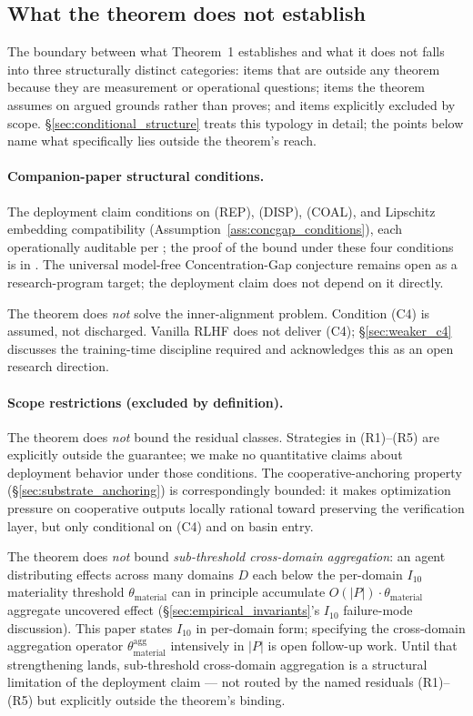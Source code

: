 \subsection{What the theorem does not establish}
\label{sec:theorem_does_not}

The boundary between what Theorem~1 establishes and what it does
not falls into three structurally distinct categories: items that
are outside any theorem because they are measurement or operational
questions; items the theorem assumes on argued grounds rather than
proves; and items explicitly excluded by scope.
\S\ref{sec:conditional_structure} treats this typology in detail;
the points below name what specifically lies outside the theorem's
reach.

\paragraph{Companion-paper structural conditions.}
The deployment claim conditions on (REP), (DISP), (COAL), and
Lipschitz embedding compatibility
(Assumption~\ref{ass:concgap_conditions}), each operationally
auditable per \citep[\S 6]{lasser2026foundations}; the proof of
the bound under these four conditions is in
\citep[Theorem~2]{lasser2026foundations}. The universal
model-free Concentration-Gap conjecture remains open as a
research-program target; the deployment claim does not depend on
it directly.

The theorem does \emph{not} solve the inner-alignment problem.
Condition (C4) is assumed, not discharged.  Vanilla RLHF does not
deliver (C4); \S\ref{sec:weaker_c4} discusses the training-time
discipline required and acknowledges this as an open research
direction.

\paragraph{Scope restrictions (excluded by definition).}
The theorem does \emph{not} bound the residual classes.  Strategies
in (R1)--(R5) are explicitly outside the guarantee; we make no
quantitative claims about deployment behavior under those
conditions.  The cooperative-anchoring property
(\S\ref{sec:substrate_anchoring}) is correspondingly bounded: it
makes optimization pressure on cooperative outputs locally rational
toward preserving the verification layer, but only conditional on
(C4) and on basin entry.

The theorem does \emph{not} bound \emph{sub-threshold cross-domain
aggregation}: an agent distributing effects across many domains
$D$ each below the per-domain $I_{10}$ materiality threshold
$\theta_{\mathrm{material}}$ can in principle accumulate
$O(|P|) \cdot \theta_{\mathrm{material}}$ aggregate uncovered
effect (\S\ref{sec:empirical_invariants}'s $I_{10}$ failure-mode
discussion). This paper states $I_{10}$ in per-domain form;
specifying the cross-domain aggregation operator
$\theta_{\mathrm{material}}^{\mathrm{agg}}$ intensively in $|P|$
is open follow-up work. Until that strengthening lands,
sub-threshold cross-domain aggregation is a structural
limitation of the deployment claim --- not routed by the named
residuals (R1)--(R5) but explicitly outside the theorem's
binding.

